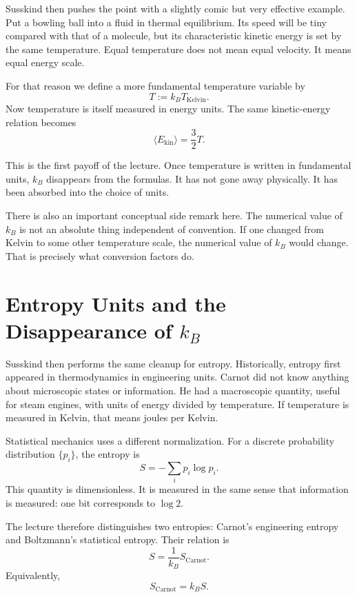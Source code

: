Susskind then pushes the point with a slightly comic but very effective example. Put a bowling ball into a fluid in thermal equilibrium. Its speed will be tiny compared with that of a molecule, but its characteristic kinetic energy is set by the same temperature. Equal temperature does not mean equal velocity. It means equal energy scale.

For that reason we define a more fundamental temperature variable by
\begin{equation}
T := k_B T_{\mathrm{Kelvin}}.
\end{equation}
Now temperature is itself measured in energy units. The same kinetic-energy relation becomes
\begin{equation}
\langle E_{\mathrm{kin}}\rangle = \frac{3}{2} T.
\end{equation}

This is the first payoff of the lecture. Once temperature is written in fundamental units, \(k_B\) disappears from the formulas. It has not gone away physically. It has been absorbed into the choice of units.

There is also an important conceptual side remark here. The numerical value of \(k_B\) is not an absolute thing independent of convention. If one changed from Kelvin to some other temperature scale, the numerical value of \(k_B\) would change. That is precisely what conversion factors do.

\section{Entropy Units and the Disappearance of \texorpdfstring{$k_B$}{kB}}

Susskind then performs the same cleanup for entropy. Historically, entropy first appeared in thermodynamics in engineering units. Carnot did not know anything about microscopic states or information. He had a macroscopic quantity, useful for steam engines, with units of energy divided by temperature. If temperature is measured in Kelvin, that means joules per Kelvin.

Statistical mechanics uses a different normalization. For a discrete probability distribution \(\{p_i\}\), the entropy is
\begin{equation}
S = -\sum_i p_i \log p_i.
\end{equation}
This quantity is dimensionless. It is measured in the same sense that information is measured: one bit corresponds to \(\log 2\).

The lecture therefore distinguishes two entropies: Carnot's engineering entropy and Boltzmann's statistical entropy. Their relation is
\begin{equation}
S = \frac{1}{k_B} S_{\mathrm{Carnot}}.
\end{equation}
Equivalently,
\begin{equation}
S_{\mathrm{Carnot}} = k_B S.
\end{equation}

